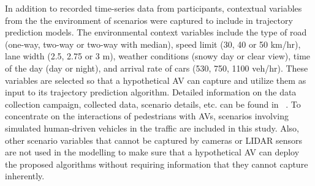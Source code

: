 In addition to recorded time-series data from participants, contextual variables from the the environment of scenarios were captured to include in trajectory prediction models. The environmental context variables include the type of road (one-way, two-way or two-way with median), speed limit (30, 40 or 50 km/hr), lane width (2.5, 2.75 or 3 m), weather conditions (snowy day or clear view), time of the day (day or night), and arrival rate of cars (530, 750, 1100 veh/hr). These variables are selected so that a hypothetical AV can capture and utilize them as input to its trajectory prediction algorithm. Detailed information on the data collection campaign, collected data, scenario details, etc. can be found in ~\cite{kalatian2020decoding}. To concentrate on the interactions of pedestrians with AVs, scenarios involving simulated human-driven vehicles in the traffic are included in this study. Also, other scenario variables that cannot be captured by cameras or LIDAR sensors are not used in the modelling to make sure that a hypothetical AV can deploy the proposed algorithms without requiring information that they cannot capture inherently.